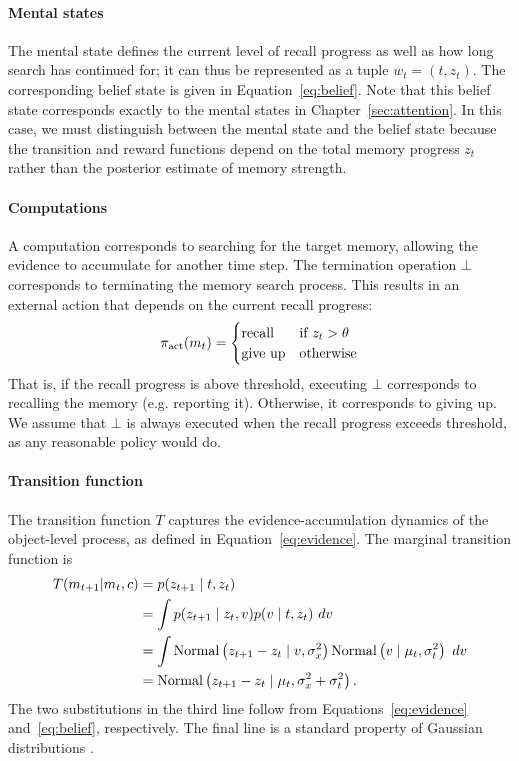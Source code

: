 \paragraph{Mental states}
The mental state defines the current level of recall progress as well as how long search has continued for; it can thus be represented as a tuple $w_t = (t, z_t)$. The corresponding belief state is given in Equation~\ref{eq:belief}. Note that this belief state corresponds exactly to the mental states in Chapter~\ref{sec:attention}. In this case, we must distinguish between the mental state and the belief state because the transition and reward functions depend on the total memory progress $z_t$ rather than the posterior estimate of memory strength.

\paragraph{Computations}
A computation corresponds to searching for the target memory, allowing the evidence to accumulate for another time step. The termination operation $\bot$ corresponds to terminating the memory search process. This results in an external action that depends on the current recall progress:
\begin{equation}
  \pi_{\text{act}}(m_t) = \begin{cases}
    \text{recall} &\text{if } z_t > \theta \\
    \text{give up} &\text{otherwise}
  \end{cases}
\end{equation}
That is, if the recall progress is above threshold, executing $\bot$ corresponds to recalling the memory (e.g. reporting it). Otherwise, it corresponds to giving up. We assume that $\bot$ is always executed when the recall progress exceeds threshold, as any reasonable policy would do.

\paragraph{Transition function}
The transition function $T$ captures the evidence-accumulation dynamics of the object-level process, as defined in Equation~\ref{eq:evidence}. The marginal transition function is
%
\begin{equation}\label{eq:mem-transition}
\begin{aligned}
  T(m_{t+1} | m_t, c) 
  &= p(z_{t+1} \mid t, z_t) \\
  &= \int p(z_{t+1} \mid z_t, v) p(v \mid t, z_t) \ dv \\
  &= \int \mathrm{Normal}\left( z_{t+1} - z_t \mid v, \sigma_x^2 \right) 
          \mathrm{Normal}\left( v \mid \mu_t, \sigma_t^2 \right)\ dv \\
  &= \mathrm{Normal}\left( z_{t+1} - z_t \mid \mu_t, \sigma_x^2 + \sigma_t^2 \right).
\end{aligned}
\end{equation}
The two substitutions in the third line follow from Equations~\ref{eq:evidence} and~\ref{eq:belief}, respectively. The final line is a standard property of Gaussian distributions \citep{murphy2007conjugate}.

